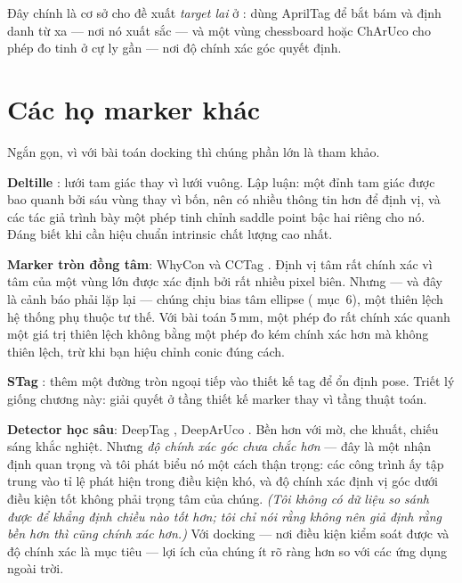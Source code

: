 \documentclass[../../marker.tex]{subfiles}
\begin{document}
Đây chính là cơ sở cho đề xuất \emph{target lai} ở : dùng AprilTag để bắt bám và định danh từ xa --- nơi nó xuất sắc --- và một vùng chessboard hoặc ChArUco cho phép đo tinh ở cự ly gần --- nơi độ chính xác góc quyết định.

\section{Các họ marker khác}

Ngắn gọn, vì với bài toán docking thì chúng phần lớn là tham khảo.

\textbf{Deltille} \cite{chen2018deltille}: lưới tam giác thay vì lưới vuông. Lập luận: một đỉnh tam giác được bao quanh bởi sáu vùng thay vì bốn, nên có nhiều thông tin hơn để định vị, và các tác giả trình bày một phép tinh chỉnh saddle point bậc hai riêng cho nó. Đáng biết khi cần hiệu chuẩn intrinsic chất lượng cao nhất.

\textbf{Marker tròn đồng tâm}: WhyCon \cite{krajnik2014whycon} và CCTag \cite{calvet2016cctag}. Định vị tâm rất chính xác vì tâm của một vùng lớn được xác định bởi rất nhiều pixel biên. Nhưng --- và đây là cảnh báo phải lặp lại --- chúng chịu bias tâm ellipse ( mục~6), một thiên lệch hệ thống phụ thuộc tư thế. Với bài toán 5\,mm, một phép đo rất chính xác quanh một giá trị thiên lệch không bằng một phép đo kém chính xác hơn mà không thiên lệch, trừ khi bạn hiệu chỉnh conic đúng cách.

\textbf{STag} \cite{benligiray2019stag}: thêm một đường tròn ngoại tiếp vào thiết kế tag để ổn định pose. Triết lý giống chương này: giải quyết ở tầng thiết kế marker thay vì tầng thuật toán.

\textbf{Detector học sâu}: DeepTag \cite{zhang2023deeptag}, DeepArUco \cite{berral2023deeparuco}. Bền hơn với mờ, che khuất, chiếu sáng khắc nghiệt. Nhưng \emph{độ chính xác góc chưa chắc hơn} --- đây là một nhận định quan trọng và tôi phát biểu nó một cách thận trọng: các công trình ấy tập trung vào tỉ lệ phát hiện trong điều kiện khó, và độ chính xác định vị góc dưới điều kiện tốt không phải trọng tâm của chúng. \emph{(Tôi không có dữ liệu so sánh được để khẳng định chiều nào tốt hơn; tôi chỉ nói rằng không nên giả định rằng bền hơn thì cũng chính xác hơn.)} Với docking --- nơi điều kiện kiểm soát được và độ chính xác là mục tiêu --- lợi ích của chúng ít rõ ràng hơn so với các ứng dụng ngoài trời.
\end{document}
